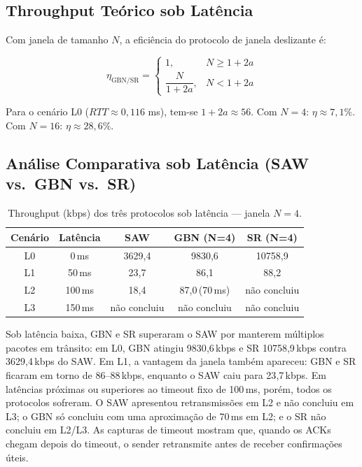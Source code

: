 \documentclass[10pt,a4paper]{article}
\begin{document}
\subsection{Throughput Teórico sob Latência}

Com janela de tamanho $N$, a eficiência do protocolo de janela deslizante é:

\begin{equation}
  \eta_{\text{GBN/SR}} =
  \begin{cases}
    1, & N \geq 1 + 2a \\[4pt]
    \dfrac{N}{1 + 2a}, & N < 1 + 2a
  \end{cases}
  \label{eq:window}
\end{equation}

Para o cenário L0 ($RTT \approx 0{,}116$ ms), tem-se $1 + 2a \approx 56$.
Com $N = 4$: $\eta \approx 7{,}1\%$.
Com $N = 16$: $\eta \approx 28{,}6\%$.

\subsection{Análise Comparativa sob Latência (SAW vs.\ GBN vs.\ SR)}

\begin{table}[H]
\centering
\caption{Throughput (kbps) dos três protocolos sob latência — janela $N=4$.}
\label{tab:lat_comp}
\begin{tabular}{@{}ccccc@{}}
\toprule
\textbf{Cenário} & \textbf{Latência} & \textbf{SAW} & \textbf{GBN (N=4)} & \textbf{SR (N=4)} \\
\midrule
L0 & 0\,ms   & 3629{,}4 & 9830{,}6 & 10758{,}9 \\
L1 & 50\,ms  & 23{,}7 & 86{,}1 & 88{,}2 \\
L2 & 100\,ms & 18{,}4 & 87{,}0\,(70\,ms) & não concluiu \\
L3 & 150\,ms & não concluiu & não concluiu & não concluiu \\
\bottomrule
\end{tabular}
\end{table}

Sob latência baixa, GBN e SR superaram o SAW por manterem múltiplos pacotes em
trânsito: em L0, GBN atingiu 9830{,}6\,kbps e SR 10758{,}9\,kbps contra
3629{,}4\,kbps do SAW. Em L1, a vantagem da janela também apareceu: GBN e SR
ficaram em torno de 86--88\,kbps, enquanto o SAW caiu para 23{,}7\,kbps. Em
latências próximas ou superiores ao timeout fixo de 100\,ms, porém, todos os
protocolos sofreram. O SAW apresentou retransmissões em L2 e não concluiu em
L3; o GBN só concluiu com uma aproximação de 70\,ms em L2; e o SR não concluiu
em L2/L3. As capturas de timeout mostram que, quando os ACKs chegam depois do
timeout, o sender retransmite antes de receber confirmações úteis.
\end{document}
